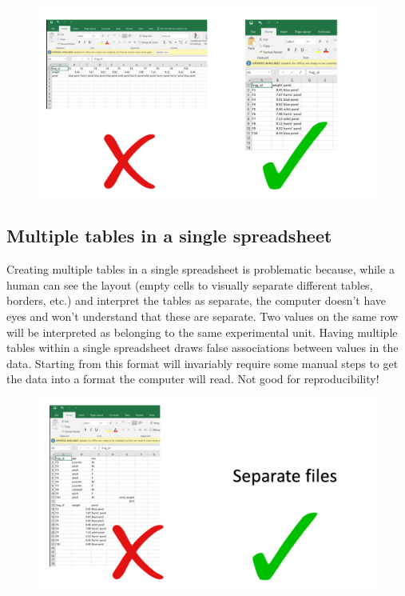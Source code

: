 \documentclass[
]{book}
\begin{document}
\begin{figure}

{\centering \includegraphics[width=1\linewidth]{img/spreadsheets_02} 

}

\caption{ }\label{fig:ss2}
\end{figure}

\hypertarget{multiple-tables-in-a-single-spreadsheet}{%
\subsection{Multiple tables in a single spreadsheet}\label{multiple-tables-in-a-single-spreadsheet}}

Creating multiple tables in a single spreadsheet is problematic because, while a human can see the layout (empty cells to visually separate different tables, borders, etc.) and interpret the tables as separate, the computer doesn't have eyes and won't understand that these are separate. Two values on the same row will be interpreted as belonging to the same experimental unit. Having multiple tables within a single spreadsheet draws false associations between values in the data. Starting from this format will invariably require some manual steps to get the data into a format the computer will read. Not good for reproducibility!

\begin{figure}

{\centering \includegraphics[width=1\linewidth]{img/spreadsheets_03} 

}

\caption{ }\label{fig:ss3}
\end{figure}
\end{document}
